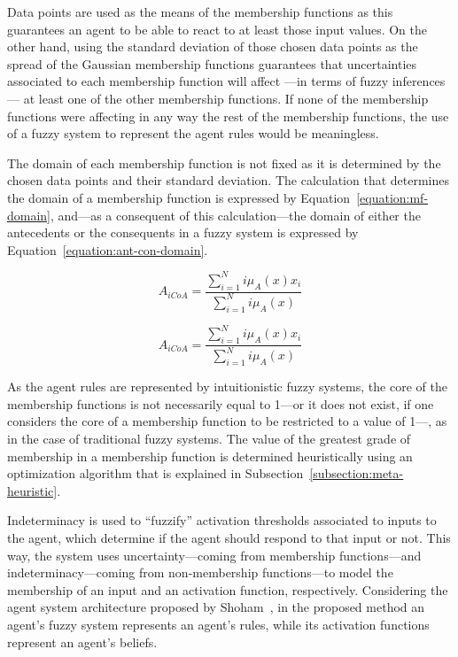 \documentclass[review]{elsarticle}
\begin{document}
Data points are used as the means of the membership functions as this guarantees
an agent to be able to react to at least those input values. On the other hand,
using the standard deviation of those chosen data points as the spread of the
Gaussian membership functions guarantees that uncertainties associated to each
membership function will affect ---in terms of fuzzy inferences--- at least one of
the other membership functions. If none of the membership functions were
affecting in any way the rest of the membership functions, the use of a fuzzy
system to represent the agent rules would be meaningless.

The domain of each membership function is not fixed as it is determined by the
chosen data points and their standard deviation. The calculation that determines
the domain of a membership function is expressed by
Equation~\ref{equation:mf-domain}, and---as a consequent of this
calculation---the domain of either the antecedents or the consequents in a fuzzy
system is expressed by Equation~\ref{equation:ant-con-domain}. %


\begin{equation}
  \label{equation:mf-domain}
  A_{iCoA} = \dfrac{\sum_{i=1}^{N} i\mu_{A}(x) x_{i}}{\sum_{i=1}^{N}
    i\mu_{A}(x)}
\end{equation}

\begin{equation}
  \label{equation:ant-con-domain}
  A_{iCoA} = \dfrac{\sum_{i=1}^{N} i\mu_{A}(x) x_{i}}{\sum_{i=1}^{N}
    i\mu_{A}(x)}
\end{equation}

As the agent rules are represented by intuitionistic fuzzy systems, the core of
the membership functions is not necessarily equal to 1---or it does not exist,
if one considers the core of a membership function to be restricted to a value
of 1---, as in the case of traditional fuzzy systems. The value of the greatest
grade of membership in a membership function is determined heuristically using
an optimization algorithm that is explained in
Subsection~\ref{subsection:meta-heuristic}.

Indeterminacy is used to ``fuzzify'' activation thresholds associated to inputs
to the agent, which determine if the agent should respond to that input or
not. This way, the system uses uncertainty---coming from membership
functions---and indeterminacy---coming from non-membership functions---to model
the membership of an input and an activation function,
respectively. Considering the agent system architecture proposed by
Shoham~\cite{Shoham1993}, in the proposed method an agent's fuzzy system
represents an agent's rules, while its activation functions represent an
agent's beliefs.
\end{document}
